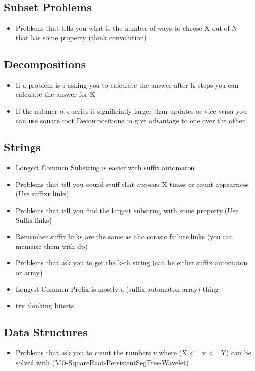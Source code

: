 \subsection{Subset Problems}
\begin{itemize}
\item Problems that tells you what is the number of ways to choose X out of N that has some property (think convolution)
\end{itemize}
\hrulefill
\subsection{Decompositions}
\begin{itemize}
\item If a problem is a asking you to calculate the answer after K steps you can calculate the answer for K%
\item If the nubmer of queries is significintly larger than updates or vice versa you can use square root Decompositions to give advantage to one over the other
\end{itemize}
\hrulefill
\subsection{Strings}
\begin{itemize}
\item Longest Common Substring is easier with suffix automaton 
\item Problems that tell you cound stuff that appears X times or count appearnces (Use suffixr links)
\item Problems that tell you find the largest substring with some property (Use Suffix links)
\item Remember suffix links are the same as aho corasic failure links (you can memoize them with dp)
\item Problems that ask you to get the k-th string (can be either suffix automaton or array)
\item Longest Common Prefix is mostly a (suffix automaton-array) thing
\item try thinking bitsets
\end{itemize}
\hrulefill
\subsection{Data Structures}
\begin{itemize}
\item Problems that ask you to count the numbers v where (X <= v <= Y) can be solved with (MO-SquareRoot-PersistentSegTree-Wavelet)
\end{itemize}
\hrulefill 
